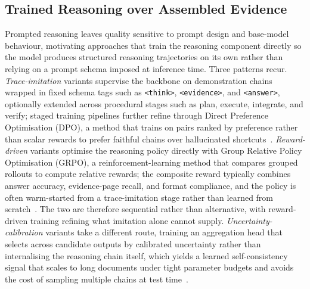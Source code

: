 \subsection{Trained Reasoning over Assembled Evidence}
\label{sec:train-reasoning}

Prompted reasoning leaves quality sensitive to prompt design and base-model behaviour, motivating approaches that train the reasoning component directly so the model produces structured reasoning trajectories on its own rather than relying on a prompt schema imposed at inference time. Three patterns recur. \textit{Trace-imitation} variants supervise the backbone on demonstration chains wrapped in fixed schema tags such as \texttt{<think>}, \texttt{<evidence>}, and \texttt{<answer>}, optionally extended across procedural stages such as plan, execute, integrate, and verify; staged training pipelines further refine through Direct Preference Optimisation (DPO), a method that trains on pairs ranked by preference rather than scalar rewards to prefer faithful chains over hallucinated shortcuts~\cite{guo2026end}. \textit{Reward-driven} variants optimise the reasoning policy directly with Group Relative Policy Optimisation (GRPO), a reinforcement-learning method that compares grouped rollouts to compute relative rewards; the composite reward typically combines answer accuracy, evidence-page recall, and format compliance, and the policy is often warm-started from a trace-imitation stage rather than learned from scratch~\cite{xiong2026docr1}. The two are therefore sequential rather than alternative, with reward-driven training refining what imitation alone cannot supply. \textit{Uncertainty-calibration} variants take a different route, training an aggregation head that selects across candidate outputs by calibrated uncertainty rather than internalising the reasoning chain itself, which yields a learned self-consistency signal that scales to long documents under tight parameter budgets and avoids the cost of sampling multiple chains at test time~\cite{hannan2026docslm}.

